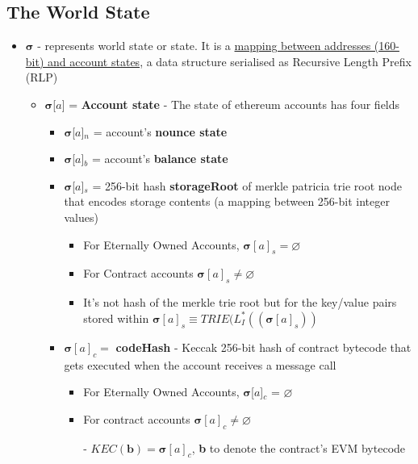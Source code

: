 \documentclass{article}
\begin{document}
\subsection{The World State}
\begin{itemize}
    \item$\bm{\sigma}$ - represents world state or state. It is a \underline{mapping between addresses (160-bit) and account states}, a data structure serialised as Recursive Length Prefix (RLP)
    \begin{itemize}
        \item$\bm{\sigma}$[$a$] = \textbf{Account state} - The state of ethereum accounts has four fields
        \begin{itemize}
            \item$\bm{\sigma}$[$a$]$_n$ = account's  \textbf{nounce state}
            \item$\bm{\sigma}$[$a$]$_b$ = account's \textbf{balance state}
            \item$\bm{\sigma}$[$a$]$_s$ =  256-bit hash \textbf{storageRoot} of merkle patricia trie root node that encodes storage contents (a mapping between 256-bit integer values)
            \begin{itemize}
                \item For Eternally Owned Accounts, $\bm{\sigma}[a]_s = \varnothing$ 
                \item For Contract accounts $\bm{\sigma}[a]_s \neq \varnothing$ 
                \item It's not hash of the merkle trie root but for the key/value pairs stored within $\bm{\sigma}[a]_s \equiv TRIE(L_I^*((\bm{\sigma}[a]_s))$ 
            \end{itemize} 
            \item$\bm{\sigma}[a]_c =$ \textbf{codeHash} -  Keccak 256-bit hash of contract bytecode that gets executed when the account receives a message call
            \begin{itemize}
                \item For Eternally Owned Accounts, $\bm{\sigma}$[$a$]$_c$ = $\varnothing$ 
                \item For contract accounts $\bm{\sigma}[a]_c \neq \varnothing$ 
                
                - $KEC(\textbf{b}) = \bm{\sigma}[a]_c$, \textbf{b} to denote the contract's EVM bytecode
                

\end{itemize}
\end{itemize}
\end{itemize}
\end{itemize}
\end{document}
